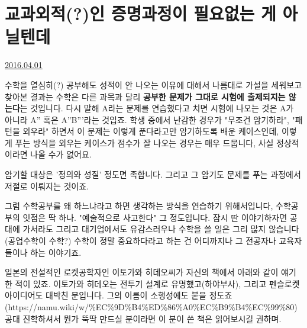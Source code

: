 \section{교과외적(?)인 증명과정이 필요없는 게 아닐텐데}
\href{https://www.kockoc.com/Apoc/706283}{2016.04.01}

\vspace{5mm}

수학을 열심히(?) 공부해도 성적이 안 나오는 이유에 대해서 나름대로 가설을 세워보고 찾아본 결과는
수학은 다른 과목과 달리 \textbf{공부한 문제가 그대로 시험에 출제되지는 않는다}는 것입니다.
다시 말해 A라는 문제를 연습했다고 치면 시험에 나오는 것은 A가 아니라 A'' 혹은 A''B'''라는 것입죠.
학생 중에서 난감한 경우가 "무조건 암기하라", "패턴을 외우라" 하면서 이 문제는 이렇게 푼다라고만 암기하도록 배운 케이스인데,
이렇게 푸는 방식을 외우는 케이스가 점수가 잘 나오는 경우는 매우 드뭅니다, 사실 정상적이라면 나올 수가 없어요.
\vspace{5mm}

암기할 대상은 '정의와 성질' 정도면 족합니다. 그리고 그 암기도 문제를 푸는 과정에서 저절로 이뤄지는 것이죠.
\vspace{5mm}

그럼 수학공부를 왜 하느냐라고 하면
생각하는 방식을 연습하기 위해서입니다, 수학공부의 잇점은 딱 하나. "예술적으로 사고한다" 그 정도입니다.
잠시 딴 이야기하자면 공대에 가서라도 그리고 대기업에서도 유감스러우나 수학을 쓸 일은 그리 많지 않습니다(공업수학이 수학?)
수학이 정말 중요하다라고 하는 건 어디까지나 그 전공자나 교육자들이나 하는 이야기죠.
\vspace{5mm}

일본의 전설적인 로켓공학자인 이토가와 히데오씨가 자신의 책에서 아래와 같이 얘기한 적이 있죠.
이토가와 히데오는 전투기 설계로 유명했고(하야부사), 그리고 펜슬로켓 아이디어도 대박친 분입니다.
그의 이름이 소행성에도 붙을 정도죠(https://namu.wiki/w/$\%$EC$\%$9D$\%$B4$\%$ED$\%$86$\%$A0$\%$EC$\%$B9$\%$B4$\%$EC$\%$99$\%$80)
공대 진학하셔서 뭔가 뚝딱 만드실 분이라면 이 분이 쓴 책은 읽어보시길 권하며.
\vspace{5mm}

